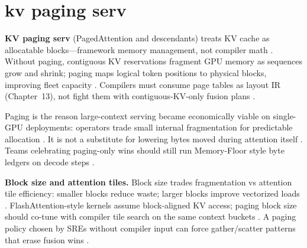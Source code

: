 \section{kv paging serv}
\label{sec:ch28_kv_paging_serv}

\textbf{KV paging serv} (PagedAttention and descendants) treats KV cache as allocatable blocks---framework memory management, not compiler math \citep{kwon2023vllm,patel2025llminference,taxbreak2026,memoryfloor2026,yirage2026,chen2020compilerbasedhardw,dao2023flashdecoding,liu2024deepseekv3,dlbook,amd2024xdna,amd2024aie,semianalysis2024tma,dao2022flashattention,nvidia2022hopper,nvidia2024cudagraphs}. Without paging, contiguous KV reservations fragment GPU memory as sequences grow and shrink; paging maps logical token positions to physical blocks, improving fleet capacity \citep{kwon2023vllm,patel2025llminference,memoryfloor2026}. Compilers must consume page tables as layout IR (Chapter~13), not fight them with contiguous-KV-only fusion plans \citep{yirage2026,chen2020compilerbasedhardw,kwon2023vllm,patel2025llminference,taxbreak2026,memoryfloor2026,dlbook}.

Paging is the reason large-context serving became economically viable on single-GPU deployments: operators trade small internal fragmentation for predictable allocation \citep{kwon2023vllm,patel2025llminference,memoryfloor2026,dlbook,yirage2026,chen2020compilerbasedhardw,taxbreak2026,dao2022flashattention,dao2023flashdecoding,liu2024deepseekv3,semianalysis2024tma,nvidia2022hopper,nvidia2024cudagraphs,amd2024xdna,amd2024aie,dlbook}. It is not a substitute for lowering bytes moved during attention itself \citep{dao2022flashattention,dao2023flashdecoding,memoryfloor2026,taxbreak2026,patel2025llminference,yirage2026,chen2020compilerbasedhardw,kwon2023vllm,dlbook}. Teams celebrating paging-only wins should still run Memory-Floor style byte ledgers on decode steps \citep{memoryfloor2026,taxbreak2026,patel2025llminference,yirage2026,chen2020compilerbasedhardw,kwon2023vllm,dao2022flashattention,dlbook}.

\textbf{Block size and attention tiles.} Block size trades fragmentation vs attention tile efficiency: smaller blocks reduce waste; larger blocks improve vectorized loads \citep{kwon2023vllm,dao2022flashattention,dao2023flashdecoding,patel2025llminference,memoryfloor2026,taxbreak2026,yirage2026,chen2020compilerbasedhardw,semianalysis2024tma,dlbook,liu2024deepseekv3,amd2024xdna,amd2024aie,nvidia2022hopper,nvidia2024cudagraphs}. FlashAttention-style kernels assume block-aligned KV access; paging block size should co-tune with compiler tile search on the same context buckets \citep{dao2022flashattention,dao2023flashdecoding,yirage2026,patel2025llminference,memoryfloor2026,taxbreak2026,dlbook}. A paging policy chosen by SREs without compiler input can force gather/scatter patterns that erase fusion wins \citep{kwon2023vllm,yirage2026,chen2020compilerbasedhardw,memoryfloor2026,taxbreak2026}.

